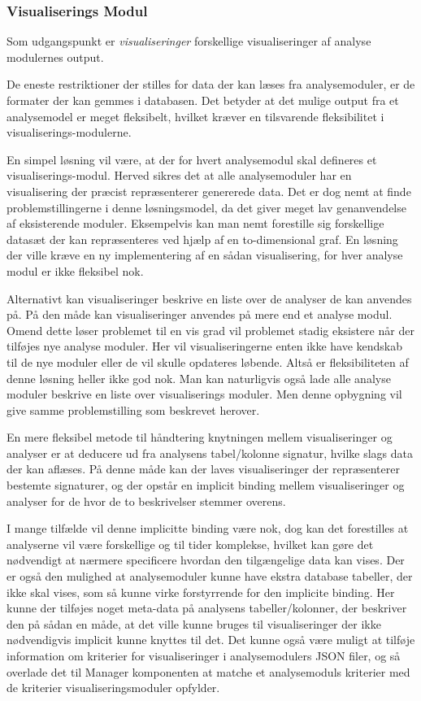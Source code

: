 \subsubsection{Visualiserings Modul}\label{sec:visningsmodul}
Som udgangspunkt er \textit{visualiseringer} forskellige visualiseringer af analyse modulernes output.

De eneste restriktioner der stilles for data der kan læses fra analysemoduler, er de formater der kan gemmes i databasen.
Det betyder at det mulige output fra et analysemodel er meget fleksibelt, hvilket kræver en tilsvarende fleksibilitet i visualiserings-modulerne.

En simpel løsning vil være, at der for hvert analysemodul skal defineres et visualiserings-modul.
Herved sikres det at alle analysemoduler har en visualisering der præcist repræsenterer genererede data.
Det er dog nemt at finde problemstillingerne i denne løsningsmodel, da det giver meget lav genanvendelse af eksisterende moduler.
Eksempelvis kan man nemt forestille sig forskellige datasæt der kan repræsenteres ved hjælp af en to-dimensional graf.
En løsning der ville kræve en ny implementering af en sådan visualisering, for hver analyse modul er ikke fleksibel nok.

Alternativt kan visualiseringer beskrive en liste over de analyser de kan anvendes på.
På den måde kan visualiseringer anvendes på mere end et analyse modul.
Omend dette løser problemet til en vis grad vil problemet stadig eksistere når der tilføjes nye analyse moduler.
Her vil visualiseringerne enten ikke have kendskab til de nye moduler eller de vil skulle opdateres løbende.
Altså er fleksibiliteten af denne løsning heller ikke god nok.
Man kan naturligvis også lade alle analyse moduler beskrive en liste over visualiserings moduler.
Men denne opbygning vil give samme problemstilling som beskrevet herover.

En mere fleksibel metode til håndtering knytningen mellem visualiseringer og analyser er at deducere ud fra analysens tabel/kolonne signatur, hvilke slags data der kan aflæses.
På denne måde kan der laves visualiseringer der repræsenterer bestemte signaturer, og der opstår en implicit binding mellem visualiseringer og analyser for de hvor de to beskrivelser stemmer overens.

I mange tilfælde vil denne implicitte binding være nok, dog kan det forestilles at analyserne vil være forskellige og til tider komplekse, hvilket kan gøre det nødvendigt at nærmere specificere hvordan den tilgængelige data kan vises.
Der er også den mulighed at analysemoduler kunne have ekstra database tabeller, der ikke skal vises, som så kunne virke forstyrrende for den implicite binding.
Her kunne der tilføjes noget meta-data på analysens tabeller/kolonner, der beskriver den på sådan en måde, at det ville kunne bruges til visualiseringer der ikke nødvendigvis implicit kunne knyttes til det.
Det kunne også være muligt at tilføje information om kriterier for visualiseringer i analysemodulers JSON filer, og så overlade det til Manager komponenten at matche et analysemoduls kriterier med de kriterier visualiseringsmoduler opfylder.

